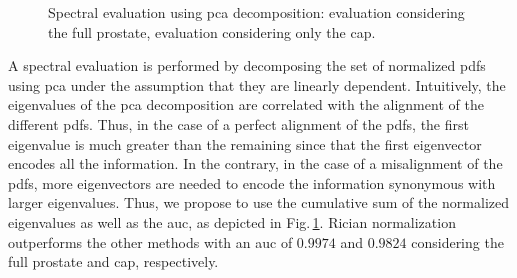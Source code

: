 \begin{figure}
  \centering
  \hfill
  \caption{Spectral evaluation using \ac{pca} decomposition: \protect{} evaluation considering the full prostate, \protect{} evaluation considering only the \ac{cap}.}
  \label{fig:qt}
\end{figure}

A spectral evaluation is performed by decomposing the set of normalized \ac{pdf}s using \ac{pca} under the assumption that they are linearly dependent. 
Intuitively, the eigenvalues of the \ac{pca} decomposition are correlated with the alignment of the different \ac{pdf}s.
Thus, in the case of a perfect alignment of the \ac{pdf}s, the first eigenvalue is much greater than the remaining since that the first eigenvector encodes all the information.
In the contrary, in the case of a misalignment of the \ac{pdf}s, more eigenvectors are needed to encode the information synonymous with larger eigenvalues.
Thus, we propose to use the cumulative sum of the normalized eigenvalues as well as the \ac{auc}, as depicted in Fig.\,\ref{fig:qt}.
Rician normalization outperforms the other methods with an \ac{auc} of $0.9974$ and $0.9824$ considering the full prostate and \ac{cap}, respectively.

